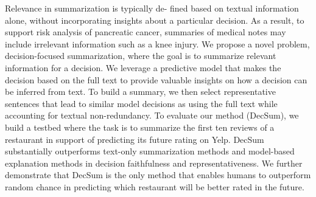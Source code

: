 Relevance in summarization is typically de- fined based on textual information alone, without incorporating insights about a particular decision. As a result, to support risk analysis of pancreatic cancer, summaries of medical notes may include irrelevant information such as a knee injury. We propose a novel problem, decision-focused summarization, where the goal is to summarize relevant information for a decision. We leverage a predictive model that makes the decision based on the full text to provide valuable insights on how a decision can be inferred from text. To build a summary, we then select representative sentences that lead to similar model decisions as using the full text while accounting for textual non-redundancy. To evaluate our method (DecSum), we build a testbed where the task is to summarize the first ten reviews of a restaurant in support of predicting its future rating on Yelp. DecSum substantially outperforms text-only summarization methods and model-based explanation methods in decision faithfulness and representativeness. We further demonstrate that DecSum is the only method that enables humans to outperform random chance in predicting which restaurant will be better rated in the future.
